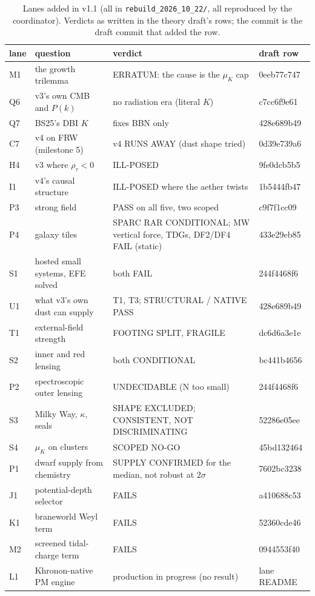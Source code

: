 \documentclass[10pt]{article}
\begin{document}
\begin{table}[t]\centering\small
\caption{Lanes added in v1.1 (all in \texttt{rebuild\_2026\_10\_22/}, all reproduced by the coordinator). Verdicts as written in the theory draft's rows; the commit is the draft commit that added the row.}\label{tab:lanes2}
\begin{tabular}{lp{}p{}l}
\toprule
lane & question & verdict & draft row\\
\midrule
M1 & the growth trilemma & ERRATUM: the cause is the $\mu_K$ cap & 0eeb77c747\\
Q6 & v3's own CMB and $P(k)$ & no radiation era (literal $K$) & c7cc6f9e61\\
Q7 & BS25's DBI $K$ & fixes BBN only & 428e689b49\\
C7 & v4 on FRW (milestone 5) & v4 RUNS AWAY (dust shape tried) & 0d39e739a6\\
H4 & v3 where $\rho_\tau<0$ & ILL-POSED & 9fe0dcb5b5\\
I1 & v4's causal structure & ILL-POSED where the aether twists & 1b5444fb47\\
P3 & strong field & PASS on all five, two scoped & c9f7f1cc09\\
P4 & galaxy tiles & SPARC RAR CONDITIONAL; MW vertical force, TDGs, DF2/DF4 FAIL (static) & 433e29eb85\\
S1 & hosted small systems, EFE solved & both FAIL & 244f4468f6\\
U1 & what v3's own dust can supply & T1, T3; STRUCTURAL / NATIVE PASS & 428e689b49\\
T1 & external-field strength & FOOTING SPLIT, FRAGILE & dc6d6a3e1e\\
S2 & inner and red lensing & both CONDITIONAL & bc441b4656\\
P2 & spectroscopic outer lensing & UNDECIDABLE (N too small) & 244f4468f6\\
S3 & Milky Way, $\kappa$, seals & SHAPE EXCLUDED; CONSISTENT, NOT DISCRIMINATING & 52286e05ee\\
S4 & $\mu_K$ on clusters & SCOPED NO-GO & 45bd132464\\
P1 & dwarf supply from chemistry & SUPPLY CONFIRMED for the median, not robust at $2\sigma$ & 7602bc3238\\
J1 & potential-depth selector & FAILS & a410688c53\\
K1 & braneworld Weyl term & FAILS & 52360cde46\\
M2 & screened tidal-charge term & FAILS & 0944553f40\\
L1 & Khronon-native PM engine & production in progress (no result) & lane README\\
\bottomrule
\end{tabular}
\end{table}
\end{document}
